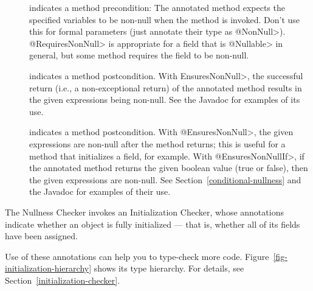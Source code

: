 \begin{description}

\item[]
  indicates a method precondition:  The annotated method expects the
  specified variables to be non-null when the
  method is invoked.  Don't use this for formal parameters (just annotate
  their type as \<@NonNull>).  \<@RequiresNonNull> is appropriate for
  a field that is \<@Nullable> in general, but some method requires the
  field to be non-null.

\item[]
  indicates a method postcondition.
  With \<EnsuresNonNull>, the successful return (i.e., a non-exceptional
  return) of the annotated method results in the given expressions being
  non-null. See the Javadoc for examples of its use.
\item[]
  indicates a method postcondition.  With \<@EnsuresNonNull>, the given
  expressions are non-null after the method returns; this is useful for a
  method that initializes a field, for example.  With
  \<@EnsuresNonNullIf>, if the annotated
  method returns the given boolean value (true or false), then the given
  expressions are non-null.  See Section~\ref{conditional-nullness} and the
  Javadoc for examples of their use.

\end{description}



The Nullness Checker invokes an Initialization Checker, whose annotations indicate whether
an object is fully initialized --- that is, whether all of its fields have
been assigned.

\begin{description}
\item[]
\item[]
\item[]
\item[]
\end{description}

\noindent
Use of these annotations can help you to type-check more
code.  Figure~\ref{fig-initialization-hierarchy} shows its type hierarchy.  For
details, see Section~\ref{initialization-checker}.


